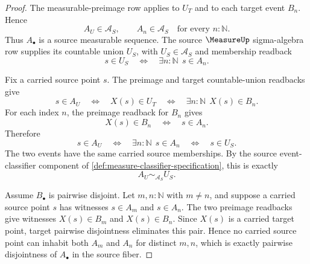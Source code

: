 \begin{proof}
The measurable-preimage row applies to $U_T$ and to each target event $B_n$. Hence
$$
A_U\in\mathcal{A}_S,\qquad A_n\in\mathcal{A}_S\quad\text{for every }n:\mathbb{N}.
$$
Thus $A_\bullet$ is a source measurable sequence. The source $\MeasureUp$ sigma-algebra row supplies its countable union $U_S$, with $U_S\in\mathcal{A}_S$ and membership readback
$$
s\in U_S\quad\Longleftrightarrow\quad \exists n:\mathbb{N}\ \ s\in A_n.
$$

Fix a carried source point $s$. The preimage and target countable-union readbacks give
$$
s\in A_U
\quad\Longleftrightarrow\quad
X(s)\in U_T
\quad\Longleftrightarrow\quad
\exists n:\mathbb{N}\ \ X(s)\in B_n.
$$
For each index $n$, the preimage readback for $B_n$ gives
$$
X(s)\in B_n\quad\Longleftrightarrow\quad s\in A_n.
$$
Therefore
$$
s\in A_U
\quad\Longleftrightarrow\quad
\exists n:\mathbb{N}\ \ s\in A_n
\quad\Longleftrightarrow\quad
s\in U_S.
$$
The two events have the same carried source memberships. By the source event-classifier component of \autoref{def:measure-classifier-specification}, this is exactly
$$
A_U\sim_{\mathcal{A}_S}U_S.
$$

Assume $B_\bullet$ is pairwise disjoint. Let $m,n:\mathbb{N}$ with $m\ne n$, and suppose a carried source point $s$ has witnesses $s\in A_m$ and $s\in A_n$. The two preimage readbacks give witnesses $X(s)\in B_m$ and $X(s)\in B_n$. Since $X(s)$ is a carried target point, target pairwise disjointness eliminates this pair. Hence no carried source point can inhabit both $A_m$ and $A_n$ for distinct $m,n$, which is exactly pairwise disjointness of $A_\bullet$ in the source fiber.
\end{proof}
